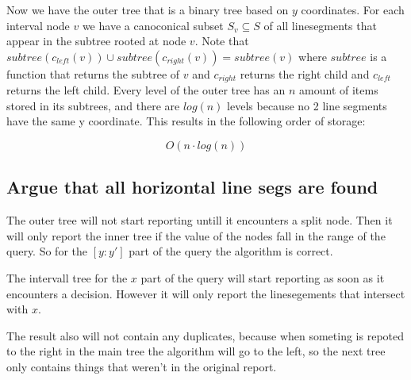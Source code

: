 \documentclass{article}
\begin{document}
Now we have the outer tree that is a binary tree based on $y$ coordinates.
For each interval node $v$ we have a canoconical subset $S_v \subseteq S$
of all linesegments that appear in the subtree rooted at node $v$.
Note that $subtree(c_{left}(v))\cup subtree(c_{right}(v)) = subtree(v)$
where $subtree$ is a function that returns the subtree of $v$ and 
$c_{right}$ returns the right child and $c_{left}$ returns the left child.
Every level of the outer tree has an $n$ amount of items stored in its
subtrees, and there are $log(n)$ levels because no 2 line segments have the
same y coordinate. This results in the following order of storage:

\[ O(n \cdot log(n))\]


\subsection{Argue that all horizontal line segs are found}
The outer tree will not start reporting untill it encounters a
split node. Then it will only report the inner tree if the
value of the nodes fall in the range of the query. So for
the $[y:y']$ part of the query the algorithm is correct.

The intervall tree for the $x$ part of the query will start
reporting as soon as it encounters a decision. However it
will only report the linesegements that intersect with $x$.

The result also will not contain any duplicates, because
when someting is repoted to the right in the main tree
the algorithm will go to the left, so the next tree only
contains things that weren't in the original report.
\end{document}
